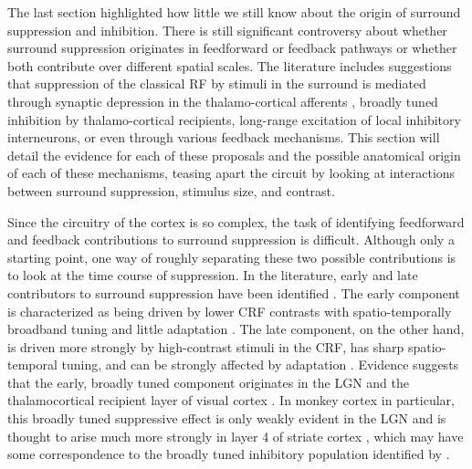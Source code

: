 The last section highlighted how little we still know about the origin
of surround suppression and inhibition. There is still significant
controversy about whether surround suppression originates in feedforward or
feedback pathways or whether both contribute over different spatial
scales. The literature includes suggestions that suppression of the
classical RF by stimuli in the surround is mediated through synaptic depression in the
thalamo-cortical afferents \citep{Carandini2002}, broadly tuned
inhibition by thalamo-cortical recipients, long-range excitation of
local inhibitory interneurons, or even through various feedback
mechanisms. This section will detail the evidence for each of these
proposals and the possible anatomical origin of each of these mechanisms,
teasing apart the circuit by looking at interactions between
surround suppression, stimulus size, and contrast.

Since the circuitry of the cortex is so complex, the task of
identifying feedforward and feedback contributions to surround
suppression is difficult. Although only a starting point, one way of
roughly separating these two possible contributions is to look at the
time course of suppression. In the literature, early and late
contributors to surround suppression have been identified
\citep{Webb2005}. The early component is characterized as being driven
by lower CRF contrasts with spatio-temporally broadband tuning and
little adaptation \citep{Levitt1997,Cavanaugh2002a}. The late
component, on the other hand, is driven more strongly by high-contrast
stimuli in the CRF, has sharp spatio-temporal tuning, and can be
strongly affected by adaptation \citep{Levitt1997}. Evidence suggests
that the early, broadly tuned component originates in the LGN and the
thalamocortical recipient layer of visual cortex
\citep{Blasdel1984a,Hawken1996}. In monkey cortex in particular, this
broadly tuned suppressive effect is only weakly evident in the LGN and
is thought to arise much more strongly in layer 4 of striate cortex
\citep{Webb2005}, which may have some correspondence to the broadly
tuned inhibitory population identified by \cite{Hirsch2003}.

